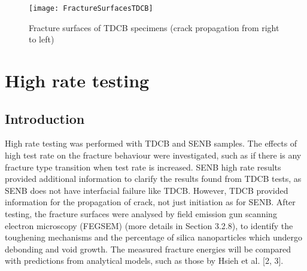 \documentclass[numbers=noendperiod,chapterprefix=on]{icldt} %
\begin{document}
\begin{figure}[!htpb]
\centering
\texttt{[image: FractureSurfacesTDCB]}
\caption{Fracture surfaces of TDCB specimens (crack propagation from right to left)} %
\end{figure}
\FloatBarrier
\section{High rate testing}
\subsection{Introduction}
High rate testing was performed with TDCB and SENB samples. The effects of high test rate on the fracture behaviour were investigated, such as if there is any fracture type transition when test rate is increased. SENB high rate results provided additional information to clarify the results found from TDCB tests, as SENB does not have interfacial failure like TDCB. However, TDCB provided information for the propagation of crack, not just initiation as for SENB. 
After testing, the fracture surfaces were analysed by field emission gun scanning electron microscopy (FEGSEM) (more details in Section 3.2.8), to identify the toughening mechanisms and the percentage of silica nanoparticles which undergo debonding and void growth. The measured fracture energies will be compared with predictions from analytical models, such as those by Hsieh et al. [2, 3].
\end{document}

